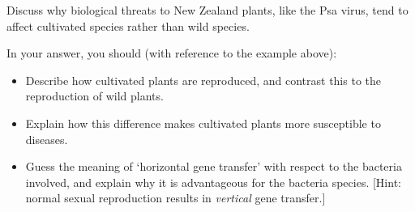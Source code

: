 \documentclass{exam}
\begin{document}
\begin{questions}
            Discuss why biological threats to New Zealand plants, like the Psa virus, tend to affect cultivated species rather than wild species.

            In your answer, you should (with reference to the example above):
            \begin{itemize}
              \item Describe how cultivated plants are reproduced, and contrast this to the reproduction of wild plants.
              \item Explain how this difference makes cultivated plants more susceptible to diseases.
              \item Guess the meaning of `horizontal gene transfer' with respect to the bacteria involved, and explain why it is advantageous for the
                    bacteria species. [Hint: normal sexual reproduction results in \emph{vertical} gene transfer.]
            \end{itemize}
\end{questions}
\end{document}
